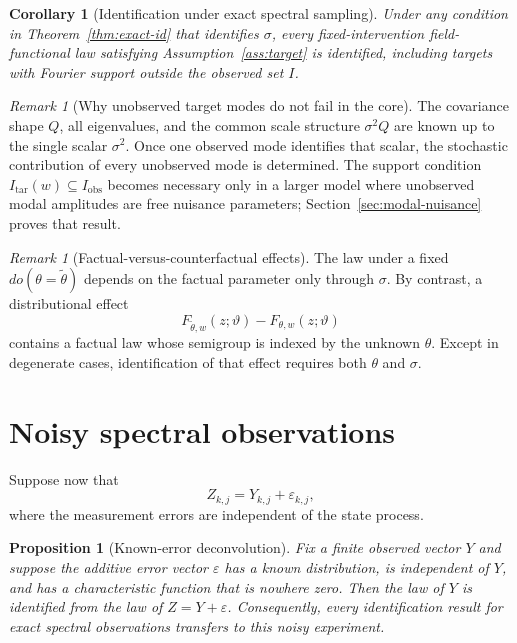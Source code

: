 \documentclass[11pt]{article}
\newtheorem{proposition}[assumption]{Proposition}
\newtheorem{corollary}[assumption]{Corollary}
\theoremstyle{remark}
\newtheorem{remark}[assumption]{Remark}
\newcommand{\obs}{\mathrm{obs}}
\newcommand{\tar}{\mathrm{tar}}
\newcommand{\1}{\mathbf 1}
\begin{document}
\begin{corollary}[Identification under exact spectral sampling]\label{cor:target-exact}
Under any condition in Theorem~\ref{thm:exact-id} that identifies $\sigma$, every fixed-intervention field-functional law satisfying Assumption~\ref{ass:target} is identified, including targets with Fourier support outside the observed set $I$.
\end{corollary}

\begin{remark}[Why unobserved target modes do not fail in the core]
The covariance shape $Q$, all eigenvalues, and the common scale structure $\sigma^2Q$ are known up to the single scalar $\sigma^2$.  Once one observed mode identifies that scalar, the stochastic contribution of every unobserved mode is determined.  The support condition $I_{\tar}(w)\subseteq I_{\obs}$ becomes necessary only in a larger model where unobserved modal amplitudes are free nuisance parameters; Section~\ref{sec:modal-nuisance} proves that result.
\end{remark}

\begin{remark}[Factual-versus-counterfactual effects]
The law under a fixed $do(\theta=\widetilde\theta)$ depends on the factual parameter only through $\sigma$.  By contrast, a distributional effect
\[
 F_{\widetilde\theta,w}(z;\vartheta)
 -F_{\theta,w}(z;\vartheta)
\]
contains a factual law whose semigroup is indexed by the unknown $\theta$.  Except in degenerate cases, identification of that effect requires both $\theta$ and $\sigma$.
\end{remark}

\section{Noisy spectral observations}

Suppose now that
\begin{equation}\label{eq:noisy-obs}
 Z_{k,j}=Y_{k,j}+\varepsilon_{k,j},
\end{equation}
where the measurement errors are independent of the state process.

\begin{proposition}[Known-error deconvolution]\label{prop:deconv}
Fix a finite observed vector $Y$ and suppose the additive error vector $\varepsilon$ has a known distribution, is independent of $Y$, and has a characteristic function that is nowhere zero.  Then the law of $Y$ is identified from the law of $Z=Y+\varepsilon$.  Consequently, every identification result for exact spectral observations transfers to this noisy experiment.
\end{proposition}
\end{document}

